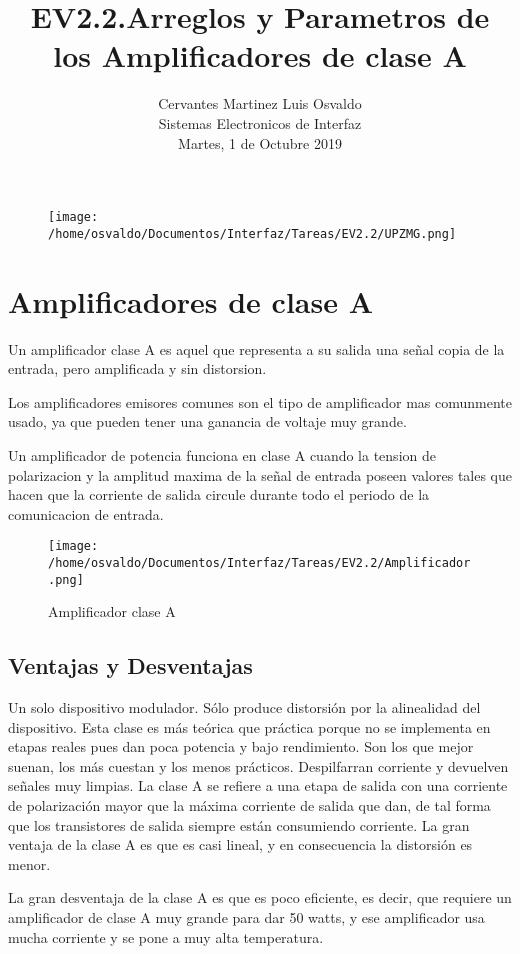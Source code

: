 \documentclass[11pt]{article}
\title{\textbf{EV2.2.Arreglos y Parametros de los Amplificadores de clase A}}
\author{Cervantes Martinez Luis Osvaldo\\
		Sistemas Electronicos de Interfaz\\
		Martes, 1 de Octubre 2019}
\date{}
\begin{document}
\maketitle

\begin{figure}[htp]
\centering
\texttt{[image: /home/osvaldo/Documentos/Interfaz/Tareas/EV2.2/UPZMG.png]}
\label{}
\end{figure}
\pagebreak

\section{ Amplificadores de clase A}
Un amplificador clase A es aquel que representa a su salida una señal copia de la entrada, pero amplificada y sin distorsion.

 Los amplificadores emisores comunes son el tipo de amplificador mas comunmente usado, ya que pueden tener una ganancia de voltaje muy grande.
 
 Un amplificador de potencia funciona en clase A cuando la tension de polarizacion y la amplitud maxima de la señal de entrada poseen valores tales que hacen que la corriente de salida circule durante todo el periodo de la comunicacion de entrada.
\begin{figure}[htp]
\centering
\texttt{[image: /home/osvaldo/Documentos/Interfaz/Tareas/EV2.2/Amplificador.png]}
\caption{Amplificador clase A}
\label{}
\end{figure}

\subsection{Ventajas y Desventajas}
Un solo dispositivo modulador. Sólo produce distorsión por la alinealidad del dispositivo. Esta clase es más teórica que práctica porque no se implementa en etapas reales pues dan poca potencia y bajo rendimiento. Son los que mejor suenan, los más cuestan y los menos prácticos. Despilfarran corriente y devuelven señales muy limpias. La clase A se refiere a una etapa de salida con una corriente de polarización mayor que la máxima corriente de salida que dan, de tal forma que los transistores de salida siempre están consumiendo corriente. La gran ventaja de la clase A es que es casi lineal, y en consecuencia la distorsión es menor.

La gran desventaja de la clase A es que es poco eficiente, es decir, que requiere un amplificador de clase A muy grande para dar 50 watts, y ese amplificador usa mucha corriente y se pone a muy alta temperatura.
\end{document}
